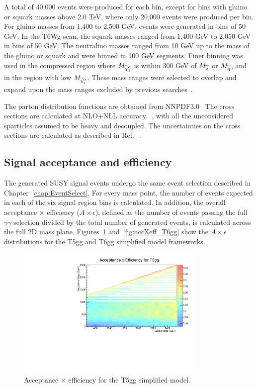 A total of 40,000 events were produced for
each bin, except for bins with gluino or squark masses above 2.0 TeV, where only
20,000 events were produced per bin.
For gluino masses from 1,400 to 2,500 GeV, events were generated
in bins of 50 GeV.  In the T6Wg scan, the squark masses ranged from
1,400 GeV to 2,050 GeV in bins of 50 GeV.
The neutralino masses ranged from 10 GeV up to the mass
of the gluino or squark and were binned in
100 GeV segments. Finer binning was used in the compressed region where
$M_{\widetilde{\chi}^{0}_{1}}$ is within 300 GeV of $M_{\widetilde{\mathrm{g}}}$ or $M_{\widetilde{\mathrm{q}}}$,
and in the region with low $M_{\widetilde{\chi}^{0}_{1}}$.
These mass ranges were selected to overlap and
expand upon the mass ranges excluded by previous
searches~\cite{ATLAS:2016aa,CMS:2016_anal}.

The parton distribution
functions are obtained from NNPDF3.0~\cite{Ball:2014uwa}
The cross sections are calculated at NLO+NLL accuracy
~\cite{Kulesza:2009kq, Beenakker:2009ha},
with all the unconsidered sparticles assumed to be heavy and decoupled.
The uncertainties on the cross sections are calculated as
described in Ref. ~\cite{Borschensky:2014cia}.



\subsection{Signal acceptance and efficiency}
The generated SUSY signal events undergo the same event selection described in Chapter~\ref{chap:EventSelect}. 
For every mass point, the number of events expected in each of the six signal region bins is calculated. 
In addition, the overall acceptance $\times$ efficiency ($A \times \epsilon$), defined as the number of events
passing the full $\gamma\gamma$ selection divided by the total number of generated events, is calculated across the 
full 2D mass plane. Figures~\ref{fig:accXeff_T5gg} and~\ref{fig:accXeff_T6gg} show the $A \times \epsilon$ distributions for the T5gg and T6gg simplified model 
frameworks.

\begin{figure}[h]
\begin{center}
\includegraphics[width=0.8\textwidth]{Figures/Results/accXeff_T5gg.pdf}
\end{center}
    \caption{Acceptance $\times$ efficiency for the T5gg simplified model.}
    \label{fig:accXeff_T5gg}
\end{figure}

